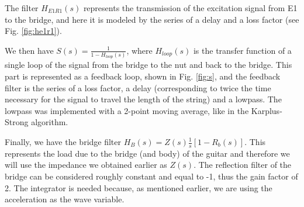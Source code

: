 \documentclass[a4paper]{article}
\begin{document}
The filter $H_{E1R1}(s)$ represents the transmission of the excitation signal from E1 to the bridge, and here it is modeled by the series of a delay and a loss factor (see Fig. \ref{fig:he1r1}).

We then have $S(s) = \frac{1}{1 - H_{loop}(s)}$, where $H_{loop}(s)$ is the transfer function of a single loop of the signal from the bridge to the nut and back to the bridge. This part is represented as a feedback loop, shown in Fig. \ref{fig:s}, and the feedback filter is the series of a loss factor, a delay (corresponding to twice the time necessary for the signal to travel the length of the string) and a lowpass. The lowpass was implemented with a 2-point moving average, like in the Karplus-Strong algorithm.

Finally, we have the bridge filter $H_B(s) = Z(s)\frac{1}{s} \left[ 1 - R_b(s) \right]$. This represents the load due to the bridge (and body) of the guitar and therefore we will use the impedance we obtained earlier as $Z(s)$. The reflection filter of the bridge can be considered roughly constant and equal to -1, thus the gain factor of 2. The integrator is needed because, as mentioned earlier, we are using the acceleration as the wave variable.
\end{document}
